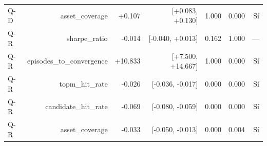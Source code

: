 \begin{table}[H]
\begin{tabular}{lrrrrrr}
Q-D & asset\_coverage & +0.107 & [+0.083, +0.130] & 1.000 & 0.000 & Sí \\
Q-R & sharpe\_ratio & -0.014 & [-0.040, +0.013] & 0.162 & 1.000 & — \\
Q-R & episodes\_to\_convergence & +10.833 & [+7.500, +14.667] & 1.000 & 0.000 & Sí \\
Q-R & topm\_hit\_rate & -0.026 & [-0.036, -0.017] & 0.000 & 0.000 & Sí \\
Q-R & candidate\_hit\_rate & -0.069 & [-0.080, -0.059] & 0.000 & 0.000 & Sí \\
Q-R & asset\_coverage & -0.033 & [-0.050, -0.013] & 0.000 & 0.004 & Sí \\
\bottomrule
\end{tabular}
\end{table}
